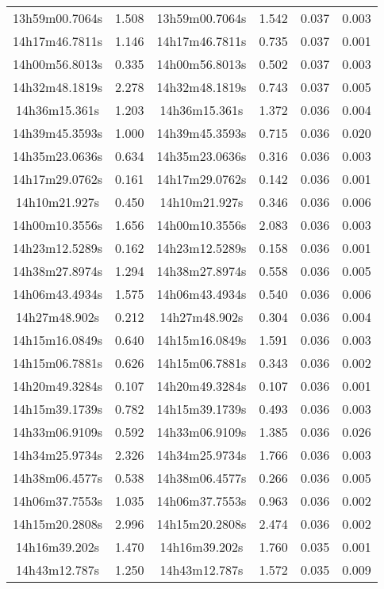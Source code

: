 \begin{table}
\begin{tabular}{cccccc}
13h59m00.7064s & 1.508 & 13h59m00.7064s & 1.542 & 0.037 & 0.003 \\
14h17m46.7811s & 1.146 & 14h17m46.7811s & 0.735 & 0.037 & 0.001 \\
14h00m56.8013s & 0.335 & 14h00m56.8013s & 0.502 & 0.037 & 0.003 \\
14h32m48.1819s & 2.278 & 14h32m48.1819s & 0.743 & 0.037 & 0.005 \\
14h36m15.361s & 1.203 & 14h36m15.361s & 1.372 & 0.036 & 0.004 \\
14h39m45.3593s & 1.000 & 14h39m45.3593s & 0.715 & 0.036 & 0.020 \\
14h35m23.0636s & 0.634 & 14h35m23.0636s & 0.316 & 0.036 & 0.003 \\
14h17m29.0762s & 0.161 & 14h17m29.0762s & 0.142 & 0.036 & 0.001 \\
14h10m21.927s & 0.450 & 14h10m21.927s & 0.346 & 0.036 & 0.006 \\
14h00m10.3556s & 1.656 & 14h00m10.3556s & 2.083 & 0.036 & 0.003 \\
14h23m12.5289s & 0.162 & 14h23m12.5289s & 0.158 & 0.036 & 0.001 \\
14h38m27.8974s & 1.294 & 14h38m27.8974s & 0.558 & 0.036 & 0.005 \\
14h06m43.4934s & 1.575 & 14h06m43.4934s & 0.540 & 0.036 & 0.006 \\
14h27m48.902s & 0.212 & 14h27m48.902s & 0.304 & 0.036 & 0.004 \\
14h15m16.0849s & 0.640 & 14h15m16.0849s & 1.591 & 0.036 & 0.003 \\
14h15m06.7881s & 0.626 & 14h15m06.7881s & 0.343 & 0.036 & 0.002 \\
14h20m49.3284s & 0.107 & 14h20m49.3284s & 0.107 & 0.036 & 0.001 \\
14h15m39.1739s & 0.782 & 14h15m39.1739s & 0.493 & 0.036 & 0.003 \\
14h33m06.9109s & 0.592 & 14h33m06.9109s & 1.385 & 0.036 & 0.026 \\
14h34m25.9734s & 2.326 & 14h34m25.9734s & 1.766 & 0.036 & 0.003 \\
14h38m06.4577s & 0.538 & 14h38m06.4577s & 0.266 & 0.036 & 0.005 \\
14h06m37.7553s & 1.035 & 14h06m37.7553s & 0.963 & 0.036 & 0.002 \\
14h15m20.2808s & 2.996 & 14h15m20.2808s & 2.474 & 0.036 & 0.002 \\
14h16m39.202s & 1.470 & 14h16m39.202s & 1.760 & 0.035 & 0.001 \\
14h43m12.787s & 1.250 & 14h43m12.787s & 1.572 & 0.035 & 0.009 \\

\end{tabular}
\end{table}
